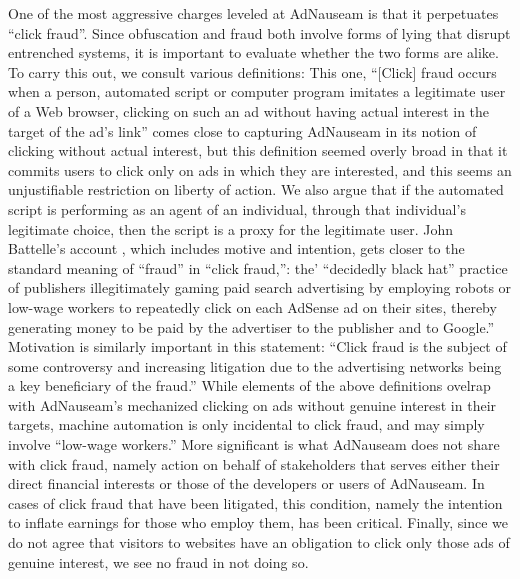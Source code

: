 \documentclass[conference]{IEEEtran}
\begin{document}
One of the most aggressive charges leveled at AdNauseam is that it perpetuates “click fraud”. Since obfuscation and fraud both involve forms of lying that disrupt entrenched systems, it is important to evaluate whether the two forms are alike.  To carry this out, we consult various definitions: This one,   “[Click] fraud occurs when a person, automated script or computer program imitates a legitimate user of a Web browser, clicking on such an ad without having actual interest in the target of the ad's link”\cite{Liu} comes close to capturing AdNauseam in its notion of clicking without actual interest, but this definition seemed overly broad in that it commits users to click only on ads in which they are interested, and this seems an unjustifiable restriction on liberty of action. We also argue that if the automated script is performing as an agent of an individual, through that individual's legitimate choice, then the script is a proxy for the legitimate user. John Battelle's account \cite{Battelle}, which includes motive and intention, gets closer to the standard meaning of “fraud” in “click fraud,”: the' “decidedly black hat” practice of publishers illegitimately gaming paid search advertising by employing robots or low-wage workers to repeatedly click on each AdSense ad on their sites, thereby generating money to be paid by the advertiser to the publisher and to Google.” Motivation is similarly important in this statement: “Click fraud is the subject of some controversy and increasing litigation due to the advertising networks being a key beneficiary of the fraud.” \cite{ClickFraud}
While elements of the above definitions ovelrap with AdNauseam's mechanized clicking on ads without genuine interest in their targets, machine automation is only incidental to click fraud, and may simply involve “low-wage workers.” More significant is what AdNauseam does not share with click fraud, namely action on behalf of stakeholders that serves either their direct financial interests or those of the developers or users of AdNauseam. In cases of click fraud that have been litigated, this condition, namely the intention to inflate earnings for those who employ them, has been critical. Finally, since we do not agree that visitors to websites have an obligation to click only those ads of genuine interest, we see no fraud in not doing so.
\end{document}
